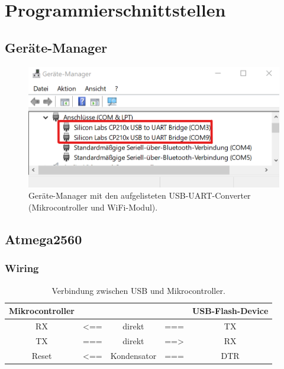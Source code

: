 
\section{Programmierschnittstellen}\label{Appendix:Programmierschnittstellen}

\subsection{Geräte-Manager}\label{Appendix:Geraete_Manager}

\begin{figure}[H]
\center
\includegraphics[width = 0.6 \textwidth]{graphics/USB_Devices_Ger_Man}
\caption{Geräte-Manager mit den aufgelisteten USB-UART-Converter (Mikrocontroller und WiFi-Modul).}
\label{fig:USB_Devices_Ger_Man}
\end{figure}

\subsection{Atmega2560}\label{Appendix:Handshake_uC}

\subsubsection{Wiring}\label{Appendix:Handshake_uC_wiring}

\begin{table}[H]
\center
\begin{tabular}{|c|lcl|c|}
\hline
\textbf{Mikrocontroller} & & & & \textbf{USB-Flash-Device} \\ \hline
RX & <== & direkt & === & TX  \\
TX & === & direkt & ==> & RX  \\
Reset & <== & Kondensator & === & DTR \\
\hline
\end{tabular}
\caption{Verbindung zwischen USB und Mikrocontroller.}
\label{tab:USB_uC}
\end{table}

